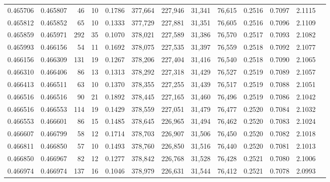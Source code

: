 \begin{tabular}{rrrrrrrrrrrrr}
0.465706 & 0.465807 &    46 &  10 &                                     0.1786 & 377,664 & 227,946 &  31,341 &  76,615 & 0.2516 & 0.7097 & 2.1115 \\
0.465812 & 0.465852 &    65 &  10 &                                     0.1333 & 377,729 & 227,881 &  31,351 &  76,605 & 0.2516 & 0.7096 & 2.1109 \\
0.465859 & 0.465971 &   292 &  35 &                                     0.1070 & 378,021 & 227,589 &  31,386 &  76,570 & 0.2517 & 0.7093 & 2.1082 \\
0.465993 & 0.466156 &    54 &  11 &                                     0.1692 & 378,075 & 227,535 &  31,397 &  76,559 & 0.2518 & 0.7092 & 2.1077 \\
0.466156 & 0.466309 &   131 &  19 &                                     0.1267 & 378,206 & 227,404 &  31,416 &  76,540 & 0.2518 & 0.7090 & 2.1065 \\
0.466310 & 0.466406 &    86 &  13 &                                     0.1313 & 378,292 & 227,318 &  31,429 &  76,527 & 0.2519 & 0.7089 & 2.1057 \\
0.466413 & 0.466511 &    63 &  10 &                                     0.1370 & 378,355 & 227,255 &  31,439 &  76,517 & 0.2519 & 0.7088 & 2.1051 \\
0.466516 & 0.466516 &    90 &  21 &                                     0.1892 & 378,445 & 227,165 &  31,460 &  76,496 & 0.2519 & 0.7086 & 2.1042 \\
0.466516 & 0.466553 &   114 &  19 &                                     0.1429 & 378,559 & 227,051 &  31,479 &  76,477 & 0.2520 & 0.7084 & 2.1032 \\
0.466553 & 0.466601 &    86 &  15 &                                     0.1485 & 378,645 & 226,965 &  31,494 &  76,462 & 0.2520 & 0.7083 & 2.1024 \\
0.466607 & 0.466799 &    58 &  12 &                                     0.1714 & 378,703 & 226,907 &  31,506 &  76,450 & 0.2520 & 0.7082 & 2.1018 \\
0.466811 & 0.466850 &    57 &  10 &                                     0.1493 & 378,760 & 226,850 &  31,516 &  76,440 & 0.2520 & 0.7081 & 2.1013 \\
0.466850 & 0.466967 &    82 &  12 &                                     0.1277 & 378,842 & 226,768 &  31,528 &  76,428 & 0.2521 & 0.7080 & 2.1006 \\
0.466974 & 0.466974 &   137 &  16 &                                     0.1046 & 378,979 & 226,631 &  31,544 &  76,412 & 0.2521 & 0.7078 & 2.0993 \\

\end{tabular}
